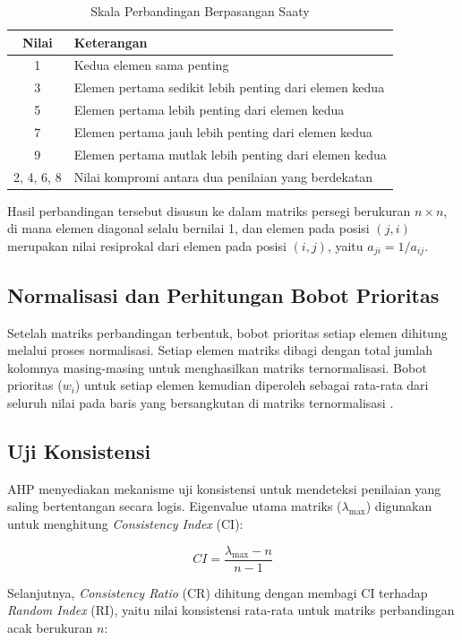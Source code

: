 \begin{table}[H]
\centering
\caption{Skala Perbandingan Berpasangan Saaty}
\label{tab:skala-saaty}
\begin{tabular}{|c|p{10cm}|}
\hline
\textbf{Nilai} & \textbf{Keterangan} \\
\hline
1 & Kedua elemen sama penting \\
3 & Elemen pertama sedikit lebih penting dari elemen kedua \\
5 & Elemen pertama lebih penting dari elemen kedua \\
7 & Elemen pertama jauh lebih penting dari elemen kedua \\
9 & Elemen pertama mutlak lebih penting dari elemen kedua \\
2, 4, 6, 8 & Nilai kompromi antara dua penilaian yang berdekatan \\
\hline
\end{tabular}
\end{table}

Hasil perbandingan tersebut disusun ke dalam matriks persegi berukuran $n \times n$, di mana elemen diagonal selalu bernilai 1, dan elemen pada posisi $(j, i)$ merupakan nilai resiprokal dari elemen pada posisi $(i, j)$, yaitu $a_{ji} = 1/a_{ij}$.

\subsection{Normalisasi dan Perhitungan Bobot Prioritas}

Setelah matriks perbandingan terbentuk, bobot prioritas setiap elemen dihitung melalui proses normalisasi. Setiap elemen matriks dibagi dengan total jumlah kolomnya masing-masing untuk menghasilkan matriks ternormalisasi. Bobot prioritas ($w_i$) untuk setiap elemen kemudian diperoleh sebagai rata-rata dari seluruh nilai pada baris yang bersangkutan di matriks ternormalisasi \cite{saaty2008decision}.

\subsection{Uji Konsistensi}

AHP menyediakan mekanisme uji konsistensi untuk mendeteksi penilaian yang saling bertentangan secara logis. Eigenvalue utama matriks ($\lambda_{\max}$) digunakan untuk menghitung \textit{Consistency Index} (CI):

$$CI = \frac{\lambda_{\max} - n}{n - 1}$$

Selanjutnya, \textit{Consistency Ratio} (CR) dihitung dengan membagi CI terhadap \textit{Random Index} (RI), yaitu nilai konsistensi rata-rata untuk matriks perbandingan acak berukuran $n$:

